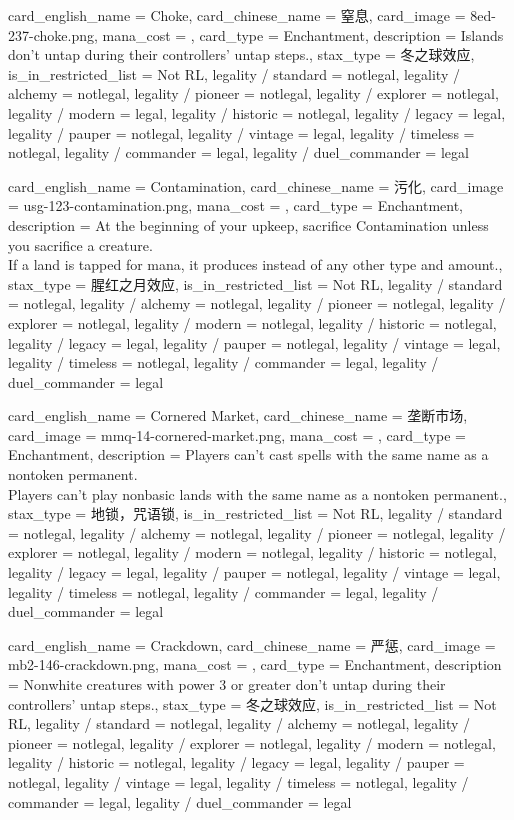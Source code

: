 \documentclass[lang = cn, color = black, 10pt]{AllThatStax}
\begin{document}
\card
{
	card_english_name = {Choke},
	card_chinese_name = {窒息},
	card_image = 8ed-237-choke.png,
	mana_cost = ,
	card_type = Enchantment,
	description = {Islands don't untap during their controllers' untap steps.},
	stax_type = 冬之球效应,
	is_in_restricted_list = Not RL,
	legality / standard = notlegal,
	legality / alchemy = notlegal,
	legality / pioneer = notlegal,
	legality / explorer = notlegal,
	legality / modern = legal,
	legality / historic = notlegal,
	legality / legacy = legal,
	legality / pauper = notlegal,
	legality / vintage = legal,
	legality / timeless = notlegal,
	legality / commander = legal,
	legality / duel_commander = legal
}

\card
{
	card_english_name = {Contamination},
	card_chinese_name = {污化},
	card_image = usg-123-contamination.png,
	mana_cost = ,
	card_type = Enchantment,
	description = {At the beginning of your upkeep, sacrifice Contamination unless you sacrifice a creature.\\
		If a land is tapped for mana, it produces  instead of any other type and amount.},
	stax_type = 腥红之月效应,
	is_in_restricted_list = Not RL,
	legality / standard = notlegal,
	legality / alchemy = notlegal,
	legality / pioneer = notlegal,
	legality / explorer = notlegal,
	legality / modern = notlegal,
	legality / historic = notlegal,
	legality / legacy = legal,
	legality / pauper = notlegal,
	legality / vintage = legal,
	legality / timeless = notlegal,
	legality / commander = legal,
	legality / duel_commander = legal
}

\card
{
	card_english_name = {Cornered Market},
	card_chinese_name = {垄断市场},
	card_image = mmq-14-cornered-market.png,
	mana_cost = ,
	card_type = Enchantment,
	description = {Players can't cast spells with the same name as a nontoken permanent.\\
		Players can't play nonbasic lands with the same name as a nontoken permanent.},
	stax_type = 地锁，咒语锁,
	is_in_restricted_list = Not RL,
	legality / standard = notlegal,
	legality / alchemy = notlegal,
	legality / pioneer = notlegal,
	legality / explorer = notlegal,
	legality / modern = notlegal,
	legality / historic = notlegal,
	legality / legacy = legal,
	legality / pauper = notlegal,
	legality / vintage = legal,
	legality / timeless = notlegal,
	legality / commander = legal,
	legality / duel_commander = legal
}

\card
{
	card_english_name = {Crackdown},
	card_chinese_name = {严惩},
	card_image = mb2-146-crackdown.png,
	mana_cost = ,
	card_type = Enchantment,
	description = {Nonwhite creatures with power 3 or greater don't untap during their controllers' untap steps.},
	stax_type = 冬之球效应,
	is_in_restricted_list = Not RL,
	legality / standard = notlegal,
	legality / alchemy = notlegal,
	legality / pioneer = notlegal,
	legality / explorer = notlegal,
	legality / modern = notlegal,
	legality / historic = notlegal,
	legality / legacy = legal,
	legality / pauper = notlegal,
	legality / vintage = legal,
	legality / timeless = notlegal,
	legality / commander = legal,
	legality / duel_commander = legal
}
\end{document}
